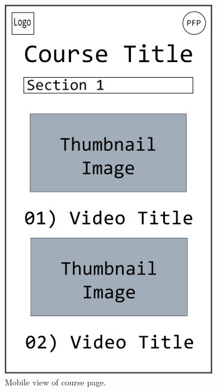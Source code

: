 \documentclass{article}
\begin{document}
\begin{figure}[h!]
    \caption{Mobile view of course page.}
    \includegraphics[width=\textwidth]{mobile_course_page}
\end{figure}
\end{document}
